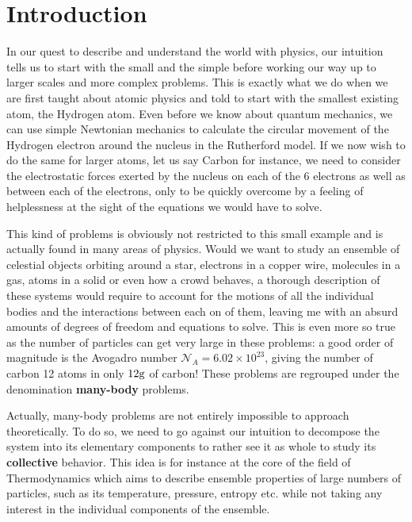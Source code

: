 \chapter*{Introduction}

\label{chap:intro}

In our quest to describe and understand the world with physics, our intuition tells us to start with the small and the simple before working our way up to larger scales and more complex problems. This is exactly what we do when we are first taught about atomic physics and told to start with the smallest existing atom, the Hydrogen atom. Even before we know about quantum mechanics, we can use simple Newtonian mechanics to calculate the circular movement of the Hydrogen electron around the nucleus in the Rutherford model. If we now wish to do the same for larger atoms, let us say Carbon for instance, we need to consider the electrostatic forces exerted by the nucleus on each of the 6 electrons as well as between each of the electrons, only to be quickly overcome by a feeling of helplessness at the sight of the equations we would have to solve.


This kind of problems is obviously not restricted to this small example and is actually found in many areas of physics. Would we want to study an ensemble of celestial objects orbiting around a star, electrons in a copper wire, molecules in a gas, atoms in a solid or even how a crowd behaves, a thorough description of these systems would require to account for the motions of all the individual bodies and the interactions between each on of them, leaving me with an absurd amounts of degrees of freedom and equations to solve. This is even more so true as the number of particles can get very large in these problems: a good order of magnitude is the Avogadro number $\mathcal{N}_A = 6.02 \times 10^{23}$, giving the number of carbon 12 atoms in only $12\rm{g}$ of carbon! These problems are regrouped under the denomination \textbf{many-body} problems. 


Actually, many-body problems are not entirely impossible to approach theoretically. To do so, we need to go against our intuition to decompose the system into its elementary components to rather see it as whole to study its \textbf{collective} behavior. This idea is for instance at the core of the field of Thermodynamics which aims to describe ensemble properties of large numbers of particles, such as its temperature, pressure, entropy etc. while not taking any interest in the individual components of the ensemble.

